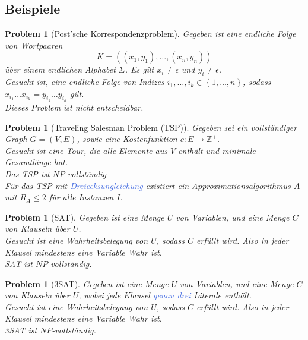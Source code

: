 \documentclass[11pt]{scrartcl}
\newcommand{\tcol}[1]{\textcolor{RoyalBlue}{#1}}
\newcommand{\set}[1]{\left\lbrace #1\right\rbrace}
\theoremstyle{break}
\newtheorem{prob}[satz]{Problem}
\begin{document}
    \subsection{Beispiele}
	\label{subsec:beispiele}

    \begin{prob}[Post'sche Korrespondenzproblem]
        Gegeben ist eine endliche Folge von Wortpaaren
        \[K=((x_1,y_1),\dots,(x_n,y_n))\]
        über einem endlichen Alphabet $\Sigma$.
        Es gilt $x_i\neq\epsilon$ und $y_i\neq\epsilon$.\\
        Gesucht ist, eine endliche Folge von Indizes $i_1,\dots,i_k\in\set{1,\dots,n}$, sodass $x_{i_1}\dots x_{i_k}=y_{i_1}\dots y_{i_k}$ gilt.\\
        Dieses Problem ist nicht entscheidbar.
    \end{prob}

    \begin{prob}[Traveling Salesman Problem (TSP)]
        Gegeben sei ein vollständiger Graph $G=(V,E)$, sowie eine Kostenfunktion $c\colon E\to\mathbb{Z}^+$.\\
        Gesucht ist eine Tour, die alle Elemente aus $V$ enthält und minimale Gesamtlänge hat.\\
        Das TSP ist $NP$-vollständig\\
        Für das TSP mit \tcol{Dreiecksungleichung} existiert ein Approximationsalgorithmus $A$ mit $R_A\leq 2$ für alle Instanzen $I$.
    \end{prob}

    \begin{prob}[SAT]
        Gegeben ist eine Menge $U$ von Variablen, und eine Menge $C$ von Klauseln über $U$.\\
        Gesucht ist eine Wahrheitsbelegung von $U$, sodass $C$ erfüllt wird.
        Also in jeder Klausel mindestens eine Variable Wahr ist.\\
        SAT ist $NP$-vollständig.
    \end{prob}

    \begin{prob}[3SAT]
        Gegeben ist eine Menge $U$ von Variablen, und eine Menge $C$ von Klauseln über $U$, wobei jede Klausel \tcol{genau drei} Literale enthält.\\
        Gesucht ist eine Wahrheitsbelegung von $U$, sodass $C$ erfüllt wird.
        Also in jeder Klausel mindestens eine Variable Wahr ist.\\
        3SAT ist $NP$-vollständig.
    \end{prob}
\end{document}
